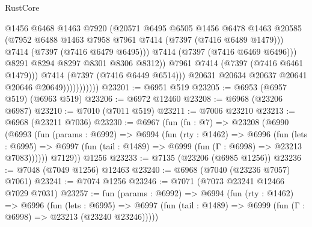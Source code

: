 \begin{lexlean}{RustCore}
\begin{coremodule}
                                    @1456
                                    @6468
                                    @1463
                                    @7920
                                    (@20571
                                      @6495
                                      @6505
                                      @1456
                                      @6478
                                      @1463
                                      @20585
                                      (@7952
                                        @6488
                                        @1463
                                        @7958
                                        @7961
                                        @7414
                                        (@7397 (@7416 @6489 @1479)))
                                      @7414
                                      (@7397 (@7416 @6479 @6495)))
                                    @7414
                                    (@7397 (@7416 @6469 @6496)))
                                  @8291
                                  @8294
                                  @8297
                                  @8301
                                  @8306
                                  @8312))
                              @7961
                              @7414
                              (@7397 (@7416 @6461 @1479)))
                            @7414
                            (@7397 (@7416 @6449 @6514)))
                          @20631
                          @20634
                          @20637
                          @20641
                          @20646
                          @20649)))))))))))
@23201 := @6951 @519
@23205 := @6953 (@6957 @519) (@6963 @519)
@23206 := @6972 @12460
@23208 := @6968 (@23206 @6987)
@23210 := @7010 (@7011 @519)
@23211 := @7006 @23210
@23213 := @6968 (@23211 @7036)
@23230 := @6967
    (fun (fn : @7) =>
    @23208
      (@6990
        (@6993
          (fun (params : @6992) =>
          @6994
            (fun (rty : @1462) =>
            @6996
              (fun (lets : @6995) =>
              @6997 (fun (tail : @1489) => @6999 (fun (Γ : @6998) => @23213 @7083))))))
        @7129))
    @1256
@23233 := @7135 (@23206 (@6985 @1256))
@23236 := @7048 (@7049 @1256) @12463
@23240 := @6968 (@7040 (@23236 @7057) @7061)
@23241 := @7074 @1256
@23246 := @7071 (@7073 @23241 @12466 @7029 @7031)
@23257 := fun (params : @6992) =>
  @6994
    (fun (rty : @1462) =>
    @6996
      (fun (lets : @6995) =>
      @6997 (fun (tail : @1489) => @6999 (fun (Γ : @6998) => @23213 (@23240 @23246)))))

\end{coremodule}
\end{lexlean}
